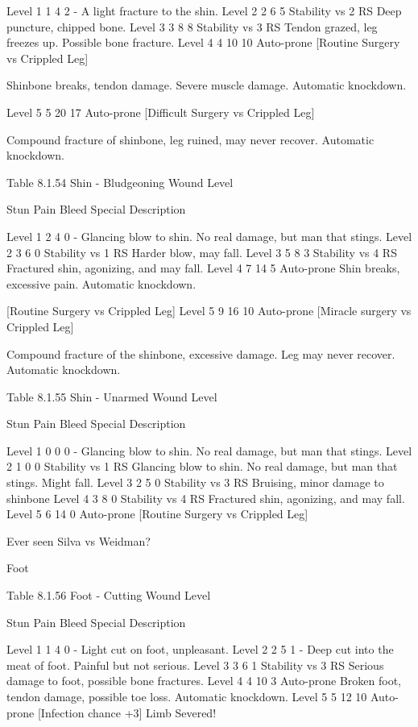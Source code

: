\documentclass[oneside,11pt,english]{book}
\begin{document}
Level 1 1 4 2 - A light fracture to the shin. 
Level 2 2 6 5 Stability vs 2 RS Deep puncture, chipped bone. 
Level 3 3 8 8 Stability vs 3 RS Tendon grazed, leg freezes up. Possible bone 
fracture. 
Level 4 4 10 10 Auto-prone 
[Routine Surgery vs 
Crippled Leg] 

Shinbone breaks, tendon damage. Severe muscle 
damage. Automatic knockdown. 

Level 5 5 20 17 Auto-prone 
[Difficult Surgery vs 
Crippled Leg] 

Compound fracture of shinbone, leg ruined, may 
never recover. Automatic knockdown. 

 
Table 8.1.54 Shin - Bludgeoning 
Wound 
Level 

Stun Pain Bleed Special Description 

Level 1 2 4 0 - Glancing blow to shin. No real damage, but man that 
stings. 
Level 2 3 6 0 Stability vs 1 RS Harder blow, may fall. 
Level 3 5 8 3 Stability vs 4 RS Fractured shin, agonizing, and may fall. 
Level 4 7 14 5 Auto-prone Shin breaks, excessive pain. Automatic knockdown. 


[Routine Surgery vs 
Crippled Leg] 
Level 5 9 16 10 Auto-prone 
[Miracle surgery vs 
Crippled Leg] 

Compound fracture of the shinbone, excessive damage. 
Leg may never recover. Automatic knockdown. 

 
Table 8.1.55 Shin - Unarmed 
Wound 
Level 

Stun Pain Bleed Special Description 

Level 1 0 0 0 - Glancing blow to shin. No real damage, but man 
that stings. 
Level 2 1 0 0 Stability vs 1 RS Glancing blow to shin. No real damage, but man 
that stings. Might fall. 
Level 3 2 5 0 Stability vs 3 RS Bruising, minor damage to shinbone 
Level 4 3 8 0 Stability vs 4 RS Fractured shin, agonizing, and may fall. 
Level 5 6 14 0 Auto-prone 
[Routine Surgery vs 
Crippled Leg] 

Ever seen Silva vs Weidman? 

 

 

Foot 

 

Table 8.1.56 Foot - Cutting 
Wound 
Level 

Stun Pain Bleed Special Description 

Level 1 1 4 0 - Light cut on foot, unpleasant. 
Level 2 2 5 1 - Deep cut into the meat of foot. Painful but not 
serious. 
Level 3 3 6 1 Stability vs 3 RS Serious damage to foot, possible bone fractures. 
Level 4 4 10 3 Auto-prone Broken foot, tendon damage, possible toe loss. 
Automatic knockdown. 
Level 5 5 12 10 Auto-prone 
[Infection chance +3] 
Limb Severed! 
\end{document}
